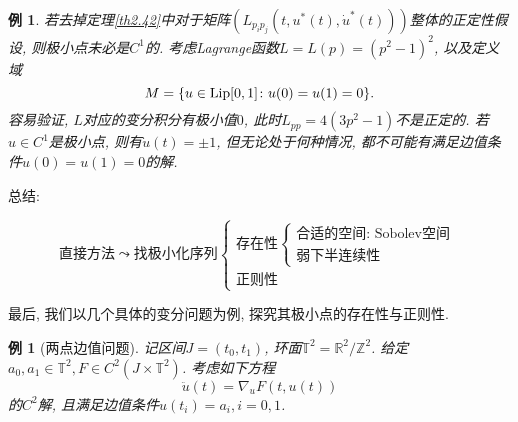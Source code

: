 \documentclass[12pt,a4paper]{article}
\newtheorem{example}[theorem]{例}
\begin{document}
\begin{example}
    若去掉定理\ref{th2.42}中对于矩阵$(L_{p_ip_j}(t, u^*(t), \dot u^*(t)))$整体的正定性假设, 则极小点未必是$C^1$的.
    考虑Lagrange函数$L = L(p) = (p^2 - 1)^2$, 以及定义域
    \begin{equation*}
        M = \{u \in {\rm Lip}[0, 1]\colon u(0) = u(1) = 0\}.
    \end{equation*}
    容易验证, $L$对应的变分积分有极小值$0$, 此时$L_{pp} = 4(3p^2 - 1)$不是正定的.
    若$u \in C^1$是极小点, 则有$\dot u(t) = \pm 1$, 但无论处于何种情况, 都不可能有满足边值条件$u(0) = u(1) = 0$的解.
\end{example}

总结:

\begin{equation*}
    \text{直接方法} \leadsto \text{找极小化序列}
    \begin{cases}
        \text{存在性}
        \begin{cases}
            \text{合适的空间: Sobolev空间} \\ 
            \text{弱下半连续性}
        \end{cases} \\ 
        \text{正则性}
    \end{cases}
\end{equation*}

最后, 我们以几个具体的变分问题为例, 探究其极小点的存在性与正则性.

\begin{example}[两点边值问题]
    记区间$J = (t_0, t_1)$, 环面$\mathbb{T}^2 = \mathbb{R}^2/\mathbb{Z}^2$.
    给定$a_0, a_1 \in \mathbb{T}^2, F \in C^2(J \times \mathbb{T}^2)$. 
    考虑如下方程 
    \begin{equation}\label{40}
        \ddot u(t) = \nabla_uF(t, u(t))
    \end{equation}
    的$C^2$解, 且满足边值条件$u(t_i) = a_i, i = 0, 1$.
\end{example}
\end{document}
